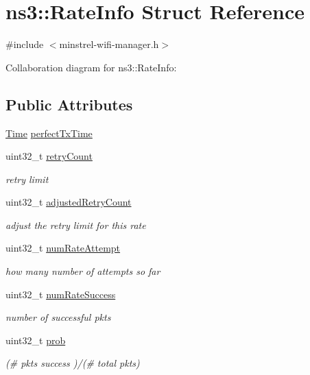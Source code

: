 \hypertarget{structns3_1_1RateInfo}{}\section{ns3\+:\+:Rate\+Info Struct Reference}
\label{structns3_1_1RateInfo}


{\ttfamily \#include $<$minstrel-\/wifi-\/manager.\+h$>$}



Collaboration diagram for ns3\+:\+:Rate\+Info\+:
\subsection*{Public Attributes}
\begin{DoxyCompactItemize}
\item 
\hyperlink{classns3_1_1Time}{Time} \hyperlink{structns3_1_1RateInfo_ac23dffcf7383a1adaadc94bb0391c86a}{perfect\+Tx\+Time}
\item 
uint32\+\_\+t \hyperlink{structns3_1_1RateInfo_ab222813b4eee4612825c77be82a75bfe}{retry\+Count}
\begin{DoxyCompactList}\small\item\em retry limit \end{DoxyCompactList}\item 
uint32\+\_\+t \hyperlink{structns3_1_1RateInfo_a43cec6f05fc31f89b282febdc8b7fd1d}{adjusted\+Retry\+Count}
\begin{DoxyCompactList}\small\item\em adjust the retry limit for this rate \end{DoxyCompactList}\item 
uint32\+\_\+t \hyperlink{structns3_1_1RateInfo_ae8433a0b621c573647865b57fc50e29b}{num\+Rate\+Attempt}
\begin{DoxyCompactList}\small\item\em how many number of attempts so far \end{DoxyCompactList}\item 
uint32\+\_\+t \hyperlink{structns3_1_1RateInfo_a2d4553b391255bb5a7fc2ba9767bd582}{num\+Rate\+Success}
\begin{DoxyCompactList}\small\item\em number of successful pkts \end{DoxyCompactList}\item 
uint32\+\_\+t \hyperlink{structns3_1_1RateInfo_aafde58f06eb12e8761b096cec8833c35}{prob}
\begin{DoxyCompactList}\small\item\em (\# pkts success )/(\# total pkts) \end{DoxyCompactList}\item 

\end{DoxyCompactItemize}
